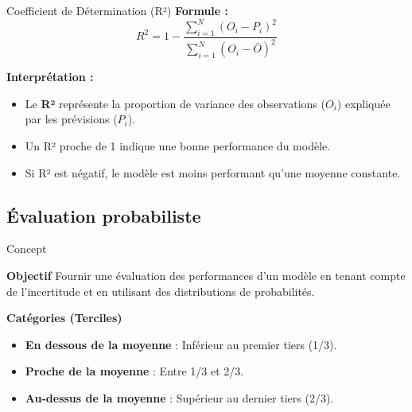 \begin{frame}{Coefficient de Détermination (R²)}
  \textbf{Formule :}
  \[
  R^2 = 1 - \frac{\sum_{i=1}^N (O_i - P_i)^2}{\sum_{i=1}^N (O_i - \bar{O})^2}
  \]

  \textbf{Interprétation :}
  \begin{itemize}
    \item Le \textbf{R²} représente la proportion de variance des observations (\(O_i\)) expliquée par les prévisions (\(P_i\)).
    \item Un R² proche de 1 indique une bonne performance du modèle.
    \item Si R² est négatif, le modèle est moins performant qu'une moyenne constante.
  \end{itemize}
\end{frame}
\subsection{Évaluation probabiliste}
\begin{frame}{Concept}
    \begin{block}{\textbf{Objectif}}
        Fournir une évaluation des performances d'un modèle en tenant compte de l'incertitude et en utilisant des distributions de probabilités. 
    \end{block}
    \begin{block}{\textbf{Catégories (Terciles)}}
        \begin{itemize}
            \item \textbf{En dessous de la moyenne} : Inférieur au premier tiers (1/3).
            \item \textbf{Proche de la moyenne} : Entre 1/3 et 2/3.
            \item \textbf{Au-dessus de la moyenne} : Supérieur au dernier tiers (2/3).
        \end{itemize}
    \end{block}
\end{frame}
